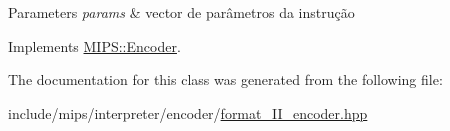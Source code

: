 \begin{DoxyParams}{Parameters}
{\em params} & vector de parâmetros da instrução \\
\hline
\end{DoxyParams}


Implements \hyperlink{classMIPS_1_1Encoder_a4a29c42d601460be8e8d353d8fc0da34}{M\+I\+P\+S\+::\+Encoder}.



The documentation for this class was generated from the following file\+:\begin{DoxyCompactItemize}
\item 
include/mips/interpreter/encoder/\hyperlink{format__II__encoder_8hpp}{format\+\_\+\+I\+I\+\_\+encoder.\+hpp}\end{DoxyCompactItemize}
